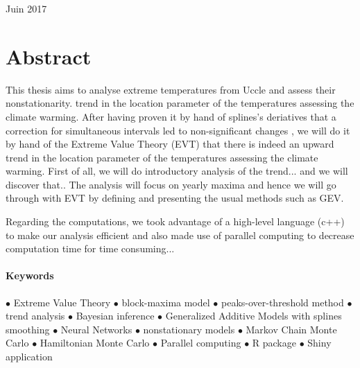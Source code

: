\documentclass[11pt,a4paper,openany ]{book}
\begin{document}
\vspace{1,5cm}



\begin{center}
	{\large Juin 2017}
\end{center}
\thispagestyle{empty}
\newpage


{}
\vspace*{\fill}
\section*{\centering Abstract}
\begin{tcolorbox}%
This thesis aims to analyse extreme temperatures from Uccle and assess their nonstationarity. trend in the location parameter of the temperatures assessing the climate warming.   
After having proven it by hand of splines's deriatives that a correction for simultaneous intervals led to non-significant changes , we will do it by hand of the Extreme Value Theory (EVT)  that there is indeed an upward trend in the location parameter of the temperatures assessing the climate warming. First of all, we will do introductory analysis of the trend... and we will discover that..  The analysis will focus on yearly maxima and hence we will go through with EVT by defining and presenting the usual methods such as GEV. 

Regarding the computations, we took advantage of a high-level language (c++) to make our analysis efficient and also made use of parallel computing to decrease computation time for time consuming...
\thispagestyle{empty}
\end{tcolorbox}

\vspace{.3cm}

\paragraph*{Keywords} $\bullet$ Extreme Value Theory   $\bullet$ block-maxima model  $\bullet$ peaks-over-threshold method $\bullet$ trend analysis $\bullet$ Bayesian inference   $\bullet$ Generalized Additive Models with splines smoothing  $\bullet$ Neural Networks  $\bullet$ nonstationary models $\bullet$ Markov Chain Monte Carlo $\bullet$ Hamiltonian Monte Carlo $\bullet$ Parallel computing $\bullet$ R package $\bullet$ Shiny application
\vspace*{\fill}
\end{document}

